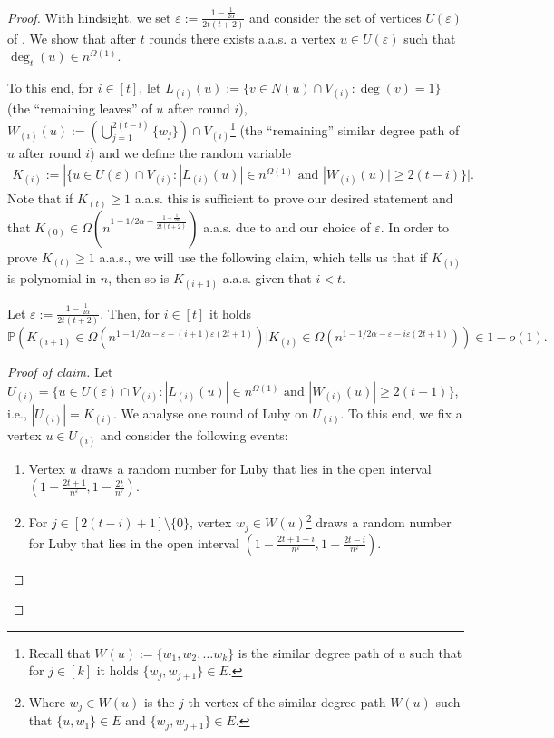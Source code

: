 \documentclass[10pt,a4paper]{amsart}
\newcommand{\Pro}[1]{\mathbb{P}\left(#1\right)}
\newcommand{\aas}{a.a.s.\xspace}
\newcommand{\eps}{\varepsilon}
\begin{document}
\begin{proof}
With hindsight, we set $\eps := \frac{1 - \frac{1}{2\alpha}}{2t(t+2)}$ and consider the set of vertices $U(\eps)$ of . We show that after $t$ rounds there exists \aas a vertex $u \in U(\eps)$ such that $\deg_t(u) \in n^{\Omega(1)}$.

To this end, for $i \in [t]$, let $L_{(i)}(u) := \{v \in N(u) \cap V_{(i)} : \deg(v) = 1\}$ (the ``remaining leaves'' of $u$ after round $i$), $W_{(i)}(u):=
\left(\bigcup_{j=1}^{2(t-i)}\{w_j\}\right)\cap V_{(i)}$\footnote{Recall that $W(u) := \{w_1, w_2, \dots w_k\}$ is the similar degree path of $u$ such that for $j \in [k]$ it holds $\{w_{j}, w_{j+1}\} \in E$.} (the ``remaining'' similar degree path of $u$ after round $i$) and we define the random variable
%
\begin{align}
    K_{(i)} := |\{u \in U(\eps) \cap V_{(i)} : |L_{(i)}(u)| \in n^{\Omega(1)} \text{ and } |W_{(i)}(u)| \geq 2(t-i)\}|.  
\end{align}
%
Note that if $K_{(t)} \geq 1$ \aas this is sufficient to prove our desired statement and that $K_{(0)} \in \Omega\left(n^{1 - 1/2\alpha - \frac{1 - \frac{1}{2\alpha}}{2t(t+2)}}\right)$ \aas due to  and our choice of $\eps$. In order to prove $K_{(t)} \geq 1$ \aas, we will use the following claim, which tells us that if $K_{(i)}$ is polynomial in $n$, then so is $K_{(i+1)}$ \aas given that $i < t$.
%
\begin{claim}\label{claim:appendix}
Let $\eps := \frac{1 - \frac{1}{2\alpha}}{2t(t+2)}$. Then, for $i \in [t]$ it holds
%
$$
\Pro{K_{(i+1)} \in \Omega\left(n^{1 - 1/2\alpha - \eps -(i+1)\eps(2t+1)} \right) | K_{(i)} \in  \Omega\left(n^{1 - 1/2\alpha - \eps -i\eps(2t+1)} \right)} \in 1 - o(1).
$$
%
\end{claim}
%
{
\renewcommand{\qedsymbol}{$\blacksquare$} %
\begin{proof}[Proof of claim] 
Let $U_{(i)} = \{u \in U(\eps) \cap V_{(i)} : |L_{(i)}(u)| \in n^{\Omega(1)} \text{ and } |W_{(i)}(u)| \geq 2(t-1)\}$, i.e., $|U_{(i)}| =  K_{(i)}$. We analyse one round of Luby on $U_{(i)}$. To this end, we fix a vertex $u \in U_{(i)}$ and consider the following events:
%
\begin{enumerate}
    \item[($\mathcal{E}_u$)] Vertex $u$ draws a random number for Luby that lies in the open interval $(1- \frac{2t + 1}{n^\eps}, 1- \frac{2t}{n^\eps})$.
    
    \item[($\mathcal{E}_{\text{path}}$)] For $j \in [2(t-i)+1 ]\setminus\{0\}$, vertex $w_j \in W(u)$\footnote{Where $w_j \in W(u)$ is the $j$-th vertex of the similar degree path $W(u)$ such that $\{u, w_1\} \in E$ and  $\{w_j, w_{j+1}\} \in E$.} draws a random number for Luby that lies in the open interval $(1- \frac{2t + 1 -i}{n^\eps}, 1- \frac{2t- i}{n^\eps})$. 
    

\end{enumerate}
\end{proof}}
\end{proof}
\end{document}
